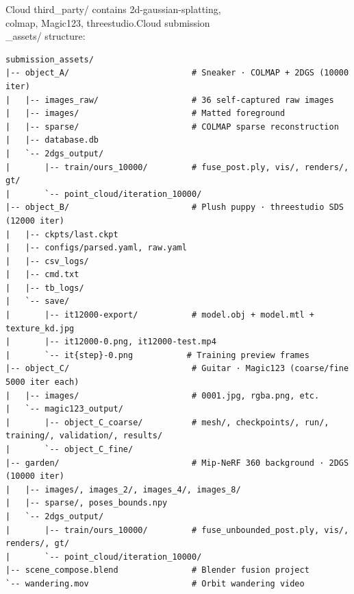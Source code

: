 \documentclass[10pt,twocolumn,letterpaper]{article}
\begin{document}
Cloud third\_party/ contains 2d-gaussian-splatting,\\ colmap, Magic123, threestudio.Cloud submission\\\_assets/ structure:
\begin{lstlisting}
submission_assets/
|-- object_A/                         # Sneaker · COLMAP + 2DGS (10000 iter)
|   |-- images_raw/                   # 36 self-captured raw images
|   |-- images/                       # Matted foreground
|   |-- sparse/                       # COLMAP sparse reconstruction
|   |-- database.db
|   `-- 2dgs_output/
|       |-- train/ours_10000/         # fuse_post.ply, vis/, renders/, gt/
|       `-- point_cloud/iteration_10000/
|-- object_B/                         # Plush puppy · threestudio SDS (12000 iter)
|   |-- ckpts/last.ckpt
|   |-- configs/parsed.yaml, raw.yaml
|   |-- csv_logs/
|   |-- cmd.txt
|   |-- tb_logs/
|   `-- save/
|       |-- it12000-export/           # model.obj + model.mtl + texture_kd.jpg
|       |-- it12000-0.png, it12000-test.mp4
|       `-- it{step}-0.png           # Training preview frames
|-- object_C/                         # Guitar · Magic123 (coarse/fine 5000 iter each)
|   |-- images/                       # 0001.jpg, rgba.png, etc.
|   `-- magic123_output/
|       |-- object_C_coarse/          # mesh/, checkpoints/, run/, training/, validation/, results/
|       `-- object_C_fine/
|-- garden/                           # Mip-NeRF 360 background · 2DGS (10000 iter)
|   |-- images/, images_2/, images_4/, images_8/
|   |-- sparse/, poses_bounds.npy
|   `-- 2dgs_output/
|       |-- train/ours_10000/         # fuse_unbounded_post.ply, vis/, renders/, gt/
|       `-- point_cloud/iteration_10000/
|-- scene_compose.blend               # Blender fusion project
`-- wandering.mov                     # Orbit wandering video
\end{lstlisting}
\end{document}
